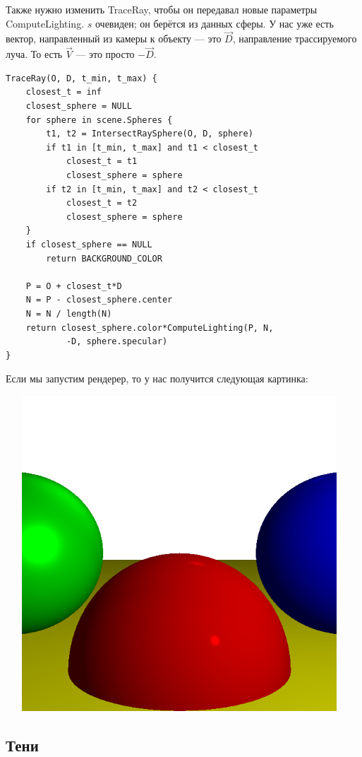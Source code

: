 Также нужно изменить TraceRay, чтобы он передавал новые параметры ComputeLighting. $s$ очевиден; он берётся из данных сферы. У нас уже есть вектор, направленный из камеры к объекту — это $\vec{D}$, направление трассируемого луча. То есть $\vec{V}$ — это просто $-\vec{D}$.

\begin{lstlisting}
TraceRay(O, D, t_min, t_max) {
    closest_t = inf
    closest_sphere = NULL
    for sphere in scene.Spheres {
        t1, t2 = IntersectRaySphere(O, D, sphere)
        if t1 in [t_min, t_max] and t1 < closest_t
            closest_t = t1
            closest_sphere = sphere
        if t2 in [t_min, t_max] and t2 < closest_t
            closest_t = t2
            closest_sphere = sphere
    }
    if closest_sphere == NULL
        return BACKGROUND_COLOR

    P = O + closest_t*D  
    N = P - closest_sphere.center  
    N = N / length(N)
    return closest_sphere.color*ComputeLighting(P, N, 
            -D, sphere.specular)
}
\end{lstlisting}

Если мы запустим рендерер, то у нас получится следующая картинка:

\includegraphics[width=13cm, height=11.8cm]{third_example.png}

\newpage
\subsection{Тени}

